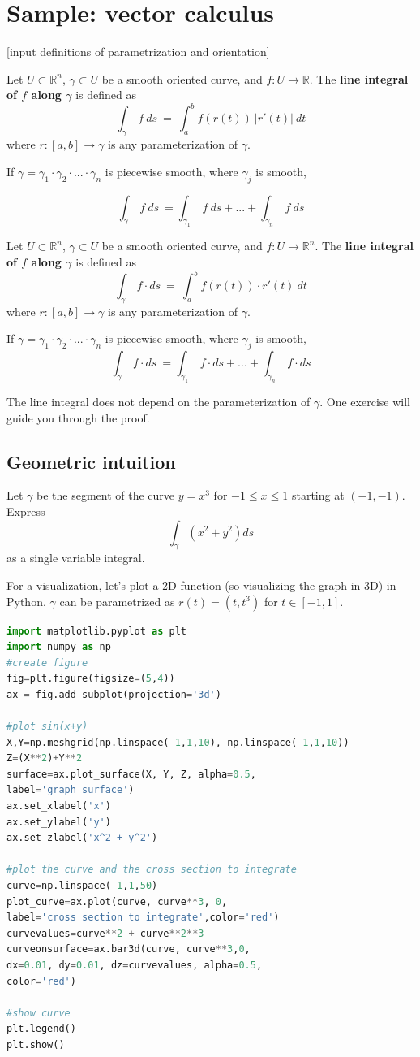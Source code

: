 \documentclass[11pt,openany]{book}
\newcommand{\definition}[2]{\begin{tcolorbox}[title=Definition ({#1}),colframe=black]{#2}\end{tcolorbox}
}
\newcommand{\example}[1]{\begin{tcolorbox}[title=Example,colframe=yellow!50!white,colback=yellow!20!white,coltitle=black]{#1}\end{tcolorbox}
}
\begin{document}
	
	\chapter{Sample: vector calculus}
	
	[input definitions of parametrization and orientation]
	\definition{Line Integral: scalar}{
		Let $U \subset \mathbb{R}^n$, $\gamma \subset U$ be a smooth oriented curve, and $f: U \to \mathbb{R}$. The \textbf{line integral of $f$ along $\gamma$} is defined as
		\[
		\int_\gamma \ f \ ds \ = \ \int_a^b f(r(t)) \ |r'(t)| \ dt
		\]
		where $r : [a,b] \to \gamma$ is any parameterization of $\gamma$.

		If $\gamma =  \gamma_1 \cdot \gamma_2 \cdot ... \cdot \gamma_n  $ is piecewise smooth, where $\gamma_j$ is smooth,

		\[
		\int_\gamma \ f \ ds \ = \int_{\gamma_1} \ f \ ds + ... + \int_{\gamma_n} \ f \ ds
		\]
	}
	\definition{Line Integral: vector}{
		Let $U \subset \mathbb{R}^n$, $\gamma \subset U$ be a smooth oriented curve, and $f: U \to \mathbb{R}^n$. The \textbf{line integral of $f$ along $\gamma$} is defined as
		\[
		\int_\gamma \ f  \cdot ds \ = \ \int_a^b f(r(t)) \cdot r'(t)  \ dt
		\]
		where $r : [a,b] \to \gamma$ is any parameterization of $\gamma$.

		If $\gamma =  \gamma_1 \cdot \gamma_2 \cdot ... \cdot \gamma_n  $ is piecewise smooth, where $\gamma_j$ is smooth,
		\[
		\int_\gamma \ f \cdot ds \ = \int_{\gamma_1} \ f \cdot ds + ... + \int_{\gamma_n} \ f \cdot ds
		\]
	}

	The line integral does not depend on the parameterization of $\gamma$. One exercise will guide you through the proof.
	\section*{Geometric intuition}
	\example{
		Let $\gamma$ be the segment of the curve $y=x^3$ for $-1\leq x\leq 1$ starting at $(-1,-1)$.
		Express 
		\[
		\int_{\gamma} (x^2 +y^2) ds
		\]
		as a single variable integral.
	}
	For a visualization, let's plot a 2D function (so visualizing the graph in 3D) in Python. $\gamma$ can be parametrized as $r(t) = (t,t^3)$ for $t\in[-1,1]$.
	\begin{lstlisting}[language=Python]
import matplotlib.pyplot as plt
import numpy as np
#create figure
fig=plt.figure(figsize=(5,4))
ax = fig.add_subplot(projection='3d')

#plot sin(x+y)
X,Y=np.meshgrid(np.linspace(-1,1,10), np.linspace(-1,1,10))
Z=(X**2)+Y**2
surface=ax.plot_surface(X, Y, Z, alpha=0.5,
label='graph surface')
ax.set_xlabel('x')
ax.set_ylabel('y')
ax.set_zlabel('x^2 + y^2')

#plot the curve and the cross section to integrate
curve=np.linspace(-1,1,50)
plot_curve=ax.plot(curve, curve**3, 0,
label='cross section to integrate',color='red')
curvevalues=curve**2 + curve**2**3
curveonsurface=ax.bar3d(curve, curve**3,0,
dx=0.01, dy=0.01, dz=curvevalues, alpha=0.5,
color='red')

#show curve
plt.legend()
plt.show()
	\end{lstlisting}
\end{document}
